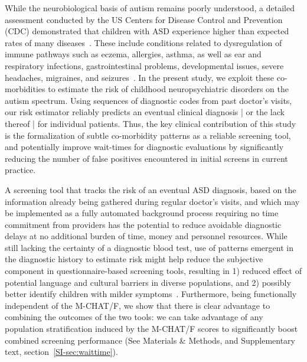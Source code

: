 \documentclass[3p,super,numbers,sort&compress,preprint,10pt]{elsarticle}
\begin{document}
\else
{}\label{figprc}
\fi

While the neurobiological basis of autism remains poorly understood,  a detailed assessment conducted by the US Centers for Disease Control and Prevention (CDC) demonstrated that  children with ASD experience  higher than expected rates of many diseases~\cite{cdc}. These include conditions related to dysregulation of immune pathways such as eczema, allergies, asthma, as well as ear and respiratory infections, gastrointestinal problems, developmental issues, severe headaches, migraines, and seizures~\cite{pmid30733689,pmid22511918}. In the present study, we exploit   these   co-morbidities to estimate the risk of  childhood neuropsychiatric disorders on the autism spectrum. Using sequences of diagnostic codes from past doctor's visits, our risk estimator reliably
predicts an eventual clinical  diagnosis | or the lack thereof |  for individual patients.
Thus, the key clinical  contribution of this study is the formalization  of subtle co-morbidity patterns as a reliable screening tool, and potentially  improve wait-times for diagnostic evaluations by significantly reducing the number of false positives encountered in initial screens in current practice.


A  screening  tool that tracks the risk of an eventual ASD diagnosis,  based  on the information already being gathered during regular doctor's visits, and which may be implemented as a  fully automated background process requiring no time commitment from providers has the potential to reduce avoidable diagnostic  delays at no additional burden of time, money and personnel resources.  While still lacking the certainty of a diagnostic blood test,  use of patterns emergent in  the diagnostic history to estimate risk might help reduce the subjective component in questionnaire-based screening tools, resulting in 1) reduced effect of potential language and cultural barriers in diverse populations, and 2) possibly better identify children with milder symptoms~\cite{hyman2020identification}.
Furthermore, being functionally independent of the M-CHAT/F, we show that there is clear advantage to combining the outcomes of the two tools: we can take advantage of any population stratification induced by the M-CHAT/F scores to significantly boost combined screening performance (See Materials \&  Methods, and Supplementary text, section~\ref{SI-sec:waittime}).
\end{document}
